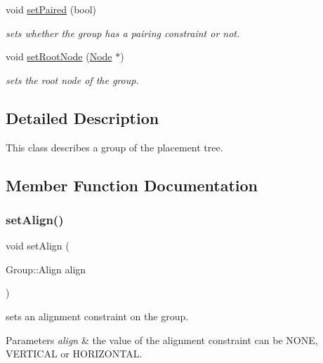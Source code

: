 \begin{DoxyCompactItemize}
void \hyperlink{class_open_chams_1_1_group_aff6de4e5c0da79ad8d0070c03bfd941b}{set\+Paired} (bool)
\begin{DoxyCompactList}\small\item\em sets whether the group has a pairing constraint or not. \end{DoxyCompactList}\item 
void \hyperlink{class_open_chams_1_1_group_adc93b900e943312e905182fe44f21225}{set\+Root\+Node} (\hyperlink{class_open_chams_1_1_node}{Node} $\ast$)
\begin{DoxyCompactList}\small\item\em sets the root node of the group. \end{DoxyCompactList}\end{DoxyCompactItemize}


\subsection{Detailed Description}
This class describes a group of the placement tree. 

\subsection{Member Function Documentation}
\mbox{\label{class_open_chams_1_1_group_a9fc27b2bc4da99c723102153c4fbf1c0}} 
\subsubsection{\texorpdfstring{set\+Align()}{setAlign()}}
{\footnotesize\ttfamily void set\+Align (\begin{DoxyParamCaption}\item[{Group\+::\+Align}]{align }\end{DoxyParamCaption})\hspace{0.3cm}{\ttfamily [inline]}}



sets an alignment constraint on the group. 


\begin{DoxyParams}{Parameters}
{\em align} & the value of the alignment constraint can be N\+O\+NE, V\+E\+R\+T\+I\+C\+AL or H\+O\+R\+I\+Z\+O\+N\+T\+AL. \\
\hline
\end{DoxyParams}
\mbox{\label{class_open_chams_1_1_group_abefcd8ede34b508fe7d42428a618cb02}} 
